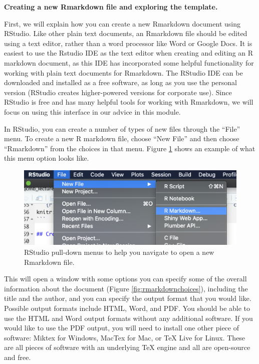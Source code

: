 \documentclass[]{tufte-book}
\begin{document}
\textbf{Creating a new Rmarkdown file and exploring the template.}

First, we will explain how you can create a new Rmarkdown document using
RStudio. Like other plain text documents, an Rmarkdown file should be edited
using a text editor, rather than a word processor like Word or Google Docs. It
is easiest to use the Rstudio IDE as the text editor when creating and editing
an R markdown document, as this IDE has incorporated some helpful functionality
for working with plain text documents for Rmarkdown. The RStudio IDE can be
downloaded and installed as a free software, as long as you use the personal
version (RStudio creates higher-powered versions for corporate use). Since
RStudio is free and has many helpful tools for working with Rmarkdown, we will
focus on using this interface in our advice in this module.

In RStudio, you can create a number of types of new files through the
``File'' menu. To create a new R markdown file, choose ``New File'' and then choose
``Rmarkdown'' from the choices in that menu. Figure \ref{fig:rmarkdownnewfile}
shows an example of what this menu option looks like.

\begin{figure}
\includegraphics[width=\textwidth]{figures/rmarkdown_newfile} \caption[RStudio pull-down menus to help you navigate to open a new Rmarkdown file]{RStudio pull-down menus to help you navigate to open a new Rmarkdown file.}\label{fig:rmarkdownnewfile}
\end{figure}

This will open a window with some options you can specify some of the overall
information about the document (Figure \ref{fig:rmarkdownchoices}), including
the title and the author, and you can specify the output format that you would
like. Possible output formats include HTML, Word, and PDF. You should be able to
use the HTML and Word output formats without any additional software. If you
would like to use the PDF output, you will need to install one other piece of
software: Miktex for Windows, MacTex for Mac, or TeX Live for Linux. These are
all pieces of software with an underlying TeX engine and all are open-source and
free.
\end{document}

